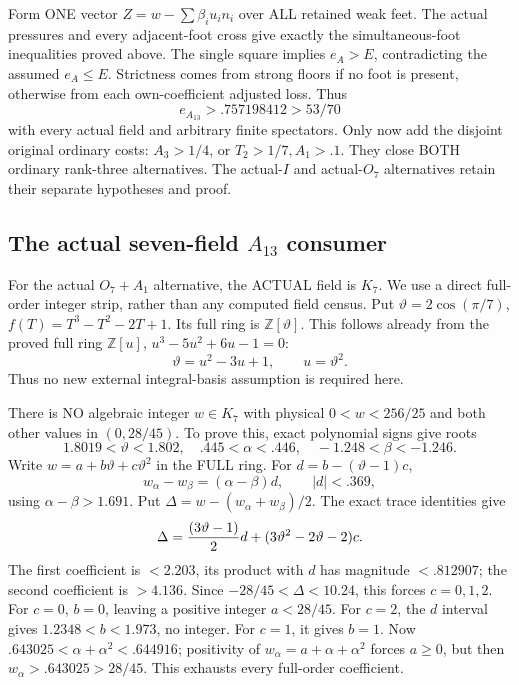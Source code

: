 Form ONE vector \(Z=w-\sum\beta_i u_i n_i\)
over ALL retained weak feet.
The actual pressures and every adjacent-foot
cross give exactly the simultaneous-foot
inequalities proved above.
The single square implies \(e_A>E\),
contradicting the assumed \(e_A\le E\).
Strictness comes from strong floors if no
foot is present, otherwise from each
own-coefficient adjusted loss.
Thus
\[
                             e_{A_{13}}>.757198412>53/70
\tag{A13U}\label{eq:arithA13universal}
\]
with every actual field and arbitrary finite
spectators.
Only now add the disjoint original ordinary
costs: \(A_3>1/4\), or \(T_2>1/7,A_1>.1\).
They close BOTH ordinary rank-three alternatives.
The actual-\(I\) and actual-\(O_7\) alternatives
retain their separate hypotheses and proof.

\subsection{The actual seven-field \(A_{13}\) consumer}
\label{app:arithA13seven}

For the actual \(O_7+A_1\) alternative,
the ACTUAL field is \(K_7\).
We use a direct full-order integer strip,
rather than any computed field census.
Put \(\vartheta=2\cos(\pi/7)\),
\(f(T)=T^3-T^2-2T+1\).
Its full ring is \(\mathbb Z[\vartheta]\).
This follows already from the proved full ring
\(\mathbb Z[u]\), \(u^3-5u^2+6u-1=0\):
\[
                    \vartheta=u^2-3u+1,\qquad u=\vartheta^2 .
\]
Thus no new external integral-basis assumption
is required here.

There is NO algebraic integer \(w\in K_7\)
with physical \(0<w<256/25\) and both other
values in \((0,28/45)\).
To prove this, exact polynomial signs give roots
\[
 1.8019<\vartheta<1.802,\quad .445<\alpha<.446,\quad
                         -1.248<\beta<-1.246 .
\]
Write \(w=a+b\vartheta+c\vartheta^2\) in
the FULL ring.
For \(d=b-(\vartheta-1)c\),
\[
             w_\alpha-w_\beta=(\alpha-\beta)d,\qquad |d|<.369 ,
\]
using \(\alpha-\beta>1.691\).
Put \(\Delta=w-(w_\alpha+w_\beta)/2\).
The exact trace identities give
\[
 \Delta={(3\vartheta-1)\over2}d+
                     (3\vartheta^2-2\vartheta-2)c.
\]
The first coefficient is \(<2.203\), its product
with \(d\) has magnitude \(<.812907\);
the second coefficient is \(>4.136\).
Since \(-28/45<\Delta<10.24\), this forces
\(c=0,1,2\).
For \(c=0\), \(b=0\), leaving a positive integer
\(a<28/45\).
For \(c=2\), the \(d\) interval gives
\(1.2348<b<1.973\), no integer.
For \(c=1\), it gives \(b=1\).
Now
\(.643025<\alpha+\alpha^2<.644916\);
positivity of \(w_\alpha=a+\alpha+\alpha^2\)
forces \(a\ge0\), but then
\(w_\alpha>.643025>28/45\).
This exhausts every full-order coefficient.

